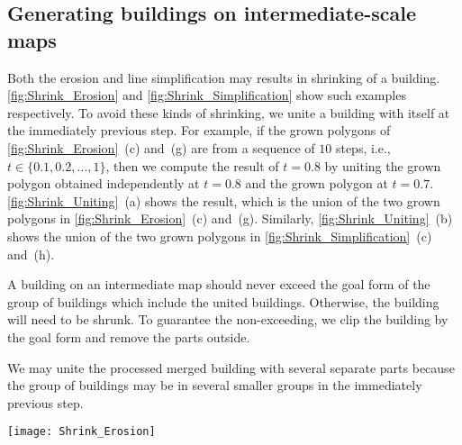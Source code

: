 \subsection{Generating buildings on intermediate-scale maps}
\label{sec:Unite}

Both the erosion and line simplification may results in shrinking of a 
building.
\fig\ref{fig:Shrink_Erosion} and \fig\ref{fig:Shrink_Simplification} show such 
examples respectively.
To avoid these kinds of shrinking,
we unite a building with itself at the immediately previous step.
For example, if the grown polygons of 
\fig\ref{fig:Shrink_Erosion}~(c) and~(g) 
are from a sequence of $10$ steps, 
i.e., $t \in \{0.1, 0.2, \dots, 1\}$, 
then we compute the result of $t=0.8$ by uniting 
the grown polygon obtained independently at $t=0.8$ and 
the grown polygon at $t=0.7$. 
\fig\ref{fig:Shrink_Uniting}~(a) shows the result,
which is the union of the two grown polygons in 
\fig\ref{fig:Shrink_Erosion}~(c) and~(g).
Similarly, \fig\ref{fig:Shrink_Uniting}~(b) shows the union of the two grown 
polygons in 
\fig\ref{fig:Shrink_Simplification}~(c) and~(h).

A building on an intermediate map should never exceed
the goal form of the group of buildings 
which include the united buildings. 
Otherwise, the building will need to be shrunk.
To guarantee the non-exceeding, 
we clip the building by the goal form 
and remove the parts outside.

We may unite the processed merged building with several separate parts 
because the group of buildings may be in several smaller groups
in the immediately previous step.

\begin{figure*}[tb]
	\centering
	\texttt{[image: Shrink\_Erosion]}
	\caption{A building shrinks during growing because of dilation and erosion, 
		where $t_1=0.6$, $t_2=0.7$, and $t_3=1$.
		The small gray polygons represent the original building.
		(a) Grow and Dilate the building with distances $\dtrm[1]{G}$ and 
		$\dtrm[1]{D}$, respectively;
		(b) Erode the polygon in (a) with distance $\dtrm[1]{D} + \dtrm[1]{E}$;
		(c) Dilate the polygon in (b) with distance $\dtrm[1]{E}$.
		(d) The large gray polygon is the target shape on goal map.
		The process for (e), (f), and (g) is the same as the process of (a), 
		(b), and (c).
		The darker gray piece in (g) shows 
		the part which is included in the grown polygon of (c), 
		but not in the grown polygon of (g).
	}
	\label{fig:Shrink_Erosion}
\end{figure*}


